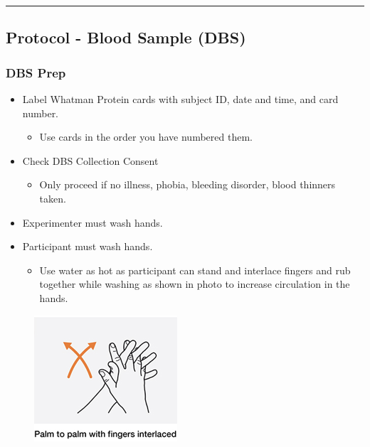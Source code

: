 \documentclass[]{book}
\providecommand{\tightlist}{%
  \setlength{\itemsep}{0pt}\setlength{\parskip}{0pt}}
\begin{document}
\begin{center}\rule{0.5\linewidth}{0.5pt}\end{center}

\hypertarget{protocol---blood-sample-dbs}{%
\subsection{Protocol - Blood Sample (DBS)}\label{protocol---blood-sample-dbs}}

\hypertarget{dbs-prep}{%
\subsubsection{DBS Prep}\label{dbs-prep}}

\begin{itemize}
\tightlist
\item
  Label Whatman Protein cards with subject ID, date and time, and card number.

  \begin{itemize}
  \tightlist
  \item
    Use cards in the order you have numbered them.
  \end{itemize}
\item
  Check DBS Collection Consent

  \begin{itemize}
  \tightlist
  \item
    Only proceed if no illness, phobia, bleeding disorder, blood thinners taken.
  \end{itemize}
\item
  Experimenter must wash hands.
\item
  Participant must wash hands.

  \begin{itemize}
  \tightlist
  \item
    Use water as hot as participant can stand and interlace fingers and rub together while washing as shown in photo to increase circulation in the hands.
  \end{itemize}
\end{itemize}

\begin{figure}
\centering
\includegraphics{images/dbs/1.png}
\caption{}
\end{figure}
\end{document}
